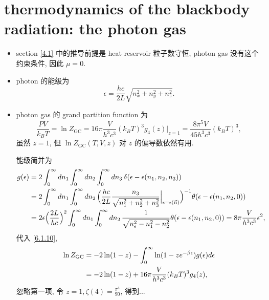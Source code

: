 \section{thermodynamics of the blackbody radiation: the photon gas}
\begin{itemize}
	\item section \ref{4.1} 中的推导前提是 heat reservoir 粒子数守恒, photon gas 没有这个约束条件, 因此 $\mu = 0$.
	
	\item photon 的能级为
	\begin{equation}
		\epsilon = \frac{h c}{2 L} \sqrt{n_x^2 + n_y^2 + n_z^2}.
	\end{equation}
	
	\item photon gas 的 grand partition function 为
	\begin{equation}
		\frac{P V}{k_B T} = \ln Z_\text{GC} = 16 \pi \frac{V}{h^3 c^3} (k_B T)^3 g_4(z) \Big|_{z = 1} = \frac{8 \pi^5 V}{45 h^3 c^3} (k_B T)^3,
	\end{equation}
	虽然 $z = 1$, 但 $\ln Z_\text{GC}(T, V, z)$ 对 $z$ 的偏导数依然有用.
	
	\begin{tcolorbox}[title=calculation:]
		能级简并为
		\begin{align}
			g(\epsilon) &= 2 \int_0^\infty dn_1 \int_0^\infty dn_2 \int_0^\infty dn_3 \, \delta(\epsilon - \epsilon(n_1, n_2, n_3)) \notag \\
			&= 2 \int_0^\infty dn_1 \int_0^\infty dn_2 \, \Big( \frac{h c}{2 L} \frac{n_3}{\sqrt{n_1^2 + n_2^2 + n_3^2}} \Big|_{\epsilon = \epsilon(\vec{n})} \Big)^{- 1} \theta(\epsilon - \epsilon(n_1, n_2, 0)) \notag \\
			&= 2 \epsilon \Big( \frac{2 L}{h c} \Big)^2 \int_0^\infty dn_1 \int_0^\infty dn_2 \, \frac{1}{\sqrt{n_\epsilon^2 - n_1^2 - n_2^2}} \theta(\epsilon - \epsilon(n_1, n_2, 0)) = 8 \pi \frac{V}{h^3 c^3} \epsilon^2,
		\end{align}
		代入 \eqref{6.1.10},
		\begin{align}
			\ln Z_\text{GC} &= - 2 \ln(1 - z) - \int_0^\infty \ln(1 - z e^{- \beta \epsilon}) g(\epsilon) d\epsilon \notag \\
			&= - 2 \ln(1 - z) + 16 \pi \frac{V}{h^3 c^3} (k_B T)^3 g_4(z),
		\end{align}
		忽略第一项, 令 $z = 1, \zeta(4) = \frac{\pi^4}{90}$, 得到...
	\end{tcolorbox}
	

\end{itemize}
